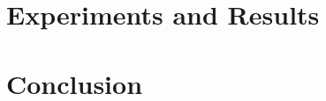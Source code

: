 \documentclass[
    headings=optiontohead,              %
    12pt,                               %
    DIV=13,                             %
    twoside=false,                      %
    open=right,                         %
    BCOR=00mm,                          %
    toc=bibliographynumbered            %
]{scrreport}
\begin{document}
    \chapter{Experiments and Results}
    \label{sec:experiments}
    
    
    
    
    
    
    
    
    

    \chapter{Conclusion}
    \label{sec:conclusion}
    

    

    \begin{appendices}
        
    \end{appendices}
\end{document}
